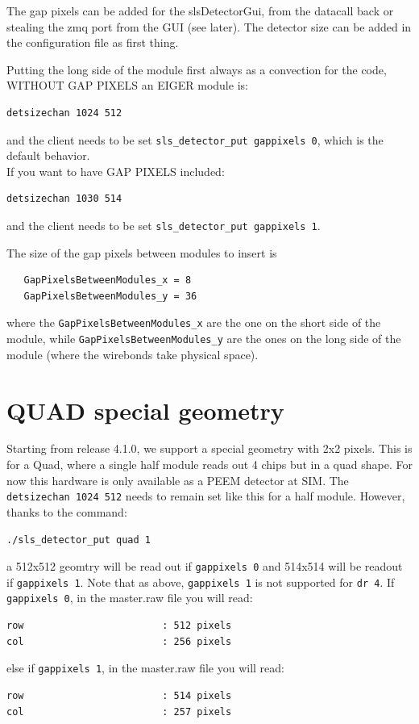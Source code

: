 \documentclass{article}
\begin{document}
The gap pixels can be added for the slsDetectorGui, from the datacall back or stealing the zmq port from the GUI (see later). The detector size can be added in the configuration file as first thing. 

Putting the long side of the module first always as a convection for the code, WITHOUT GAP PIXELS an EIGER module is:
\begin{verbatim}
detsizechan 1024 512 
\end{verbatim}
and the client needs to be set {\tt{sls\_detector\_put  gappixels 0}}, which is the default behavior.\\
If you want to have GAP PIXELS included: 
\begin{verbatim}
detsizechan 1030 514 
\end{verbatim}
and the client needs to be set {\tt{sls\_detector\_put  gappixels 1}}.

The size of the gap pixels between modules to insert is 
\begin{verbatim}
   GapPixelsBetweenModules_x = 8
   GapPixelsBetweenModules_y = 36
\end{verbatim}
where the {\tt{GapPixelsBetweenModules\_x}} are the one on the short side of the module, while {\tt{GapPixelsBetweenModules\_y}} are the ones on the long side of the module (where the wirebonds take physical space).
  \section{QUAD special geometry}
Starting from release 4.1.0, we support a special geometry with 2x2 pixels. This is for a Quad, where a single half module reads out 4 chips but in a quad shape. For now this hardware is only available as a PEEM detector at SIM. 
The {\tt{detsizechan 1024 512}} needs to remain set like this for a half module. However, thanks to the command: 
 \begin{verbatim}
./sls_detector_put quad 1
\end{verbatim}

a 512x512 geomtry will be read out if {\tt{gappixels 0}} and 514x514 will be readout if {\tt{gappixels 1}}. Note that as above, {\tt{gappixels 1}} is not supported for {\tt{dr 4}}.   
If  {\tt{gappixels 0}}, in the master.raw file you will read: 
\begin{verbatim}
row                        : 512 pixels
col                        : 256 pixels
\end{verbatim}
else if {\tt{gappixels 1}}, in the master.raw file you will read: 
\begin{verbatim}
row                        : 514 pixels
col                        : 257 pixels
\end{verbatim}
\end{document}

